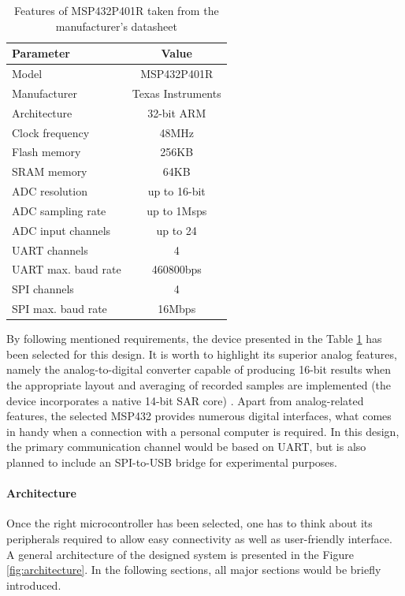 \documentclass[12pt,a4paper]{article}
\begin{document}
\begin{table}[ht!]
\begin{tabular}{|l|c|}
\hline
\textbf{Parameter}	& \textbf{Value} 	\\ \hline
Model  				& MSP432P401R       \\ \hline
Manufacturer    	& Texas Instruments	\\ \hline
Architecture       	&  32-bit ARM 		\\ \hline
Clock frequency     &  48MHz			\\ \hline
Flash memory        &  256KB			\\ \hline
SRAM memory         &  64KB				\\ \hline
ADC resolution 		&  up to 16-bit		\\ \hline
ADC sampling rate 	&  up to 1Msps 		\\ \hline
ADC input channels 	&  up to 24  		\\ \hline
UART channels 		&  4 				\\ \hline
UART max. baud rate &  460800bps 		\\ \hline
SPI channels 		&  4 				\\ \hline
SPI max. baud rate &  16Mbps 			\\ \hline
\end{tabular}
\caption{Features of MSP432P401R taken from the manufacturer's datasheet \cite{msp432_params}}
\label{tab:MSP432_params}
\end{table}

\par
By following mentioned requirements, the device presented in the Table \ref{tab:MSP432_params} has been selected for this design. It is worth to highlight its superior analog features, namely the analog-to-digital converter capable of producing 16-bit results when the appropriate layout and averaging of recorded samples are implemented (the device incorporates a native 14-bit SAR core) \cite{16bit}. Apart from analog-related features, the selected MSP432 provides numerous digital interfaces, what comes in handy when a connection with a personal computer is required. In this design, the primary communication channel would be based on UART, but is also planned to include an SPI-to-USB bridge for experimental purposes.
\par

\paragraph{Architecture}
Once the right microcontroller has been selected, one has to think about its peripherals required to allow easy connectivity as well as user-friendly interface. A general architecture of the designed system is presented in the Figure \ref{fig:architecture}. In the following sections, all major sections would be briefly introduced.
\end{document}
